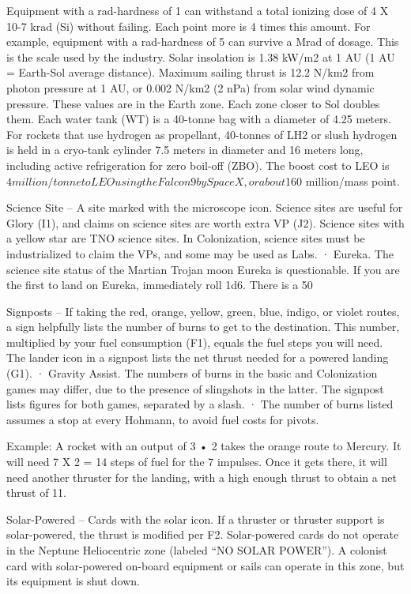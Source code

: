 \documentclass[a4paper]{book}
\begin{document}
Equipment with a rad-hardness of 1 can withstand a total ionizing dose of 4 X 10-7 krad (Si) without failing. Each point more is 4 times this amount. For example, equipment with a rad-hardness of 5 can survive a Mrad of dosage. This is the scale used by the industry.
Solar insolation is 1.38 kW/m2 at 1 AU (1 AU = Earth-Sol average distance). Maximum sailing thrust is 12.2 N/km2 from photon pressure at 1 AU, or 0.002 N/km2 (2 nPa) from solar wind dynamic pressure. These values are in the Earth zone. Each zone closer to Sol doubles them.
Each water tank (WT) is a 40-tonne bag with a diameter of 4.25 meters. For rockets that use hydrogen as propellant, 40-tonnes of LH2 or slush hydrogen is held in a cryo-tank cylinder 7.5 meters in diameter and 16 meters long, including active refrigeration for zero boil-off (ZBO).
The boost cost to LEO is $4 million/tonne to LEO using the Falcon 9 by SpaceX, or about $160 million/mass point.

Science Site – A site marked with the microscope icon. Science sites are useful for Glory (I1), and claims on science sites are worth extra VP (J2). Science sites with a yellow star are TNO science sites. In Colonization, science sites must be industrialized to claim the VPs, and some may be used as Labs.
·       Eureka. The science site status of the Martian Trojan moon Eureka is questionable. If you are the first to land on Eureka, immediately roll 1d6. There is a 50%

Signposts – If taking the red, orange, yellow, green, blue, indigo, or violet routes, a sign helpfully lists the number of burns to get to the destination. This number, multiplied by your fuel consumption (F1), equals the fuel steps you will need. The lander icon in a signpost lists the net thrust needed for a powered landing (G1).
·   	Gravity Assist. The numbers of burns in the basic and Colonization games may differ, due to the presence of slingshots in the latter. The signpost lists figures for both games, separated by a slash.
·       The number of burns listed assumes a stop at every Hohmann, to avoid fuel costs for pivots.

Example: A rocket with an output of 3 • 2 takes the orange route to Mercury. It will need 7 X 2 = 14 steps of fuel for the 7 impulses. Once it gets there, it will need another thruster for the landing, with a high enough thrust to obtain a net thrust of 11.

Solar-Powered – Cards with the solar icon. If a thruster or thruster support is solar-powered, the thrust is modified per F2. Solar-powered cards do not operate in the Neptune Heliocentric zone (labeled “NO SOLAR POWER”). A colonist card with solar-powered on-board equipment or sails can operate in this zone, but its equipment is shut down.
\end{document}
